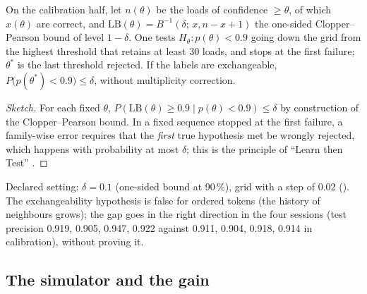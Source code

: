 \begin{proposition}\label{t3mim:prop:conforme}
On the calibration half, let $n(\theta)$ be the loads of confidence $\ge \theta$, of which $x(\theta)$ are correct, and $\mathrm{LB}(\theta) = B^{-1}(\delta;\, x, n - x + 1)$ the one-sided Clopper--Pearson bound \cite{clopper1934} of level $1 - \delta$. One tests $H_\theta : p(\theta) < 0.9$ going down the grid from the highest threshold that retains at least 30 loads, and stops at the first failure; $\theta^\ast$ is the last threshold rejected. If the labels are exchangeable, $P\bigl(p(\theta^\ast) < 0.9\bigr) \le \delta$, without multiplicity correction.
\end{proposition}
\begin{proof}[Sketch]
For each fixed $\theta$, $P(\mathrm{LB}(\theta) \ge 0.9 \mid p(\theta) < 0.9) \le \delta$ by construction of the Clopper--Pearson bound. In a fixed sequence stopped at the first failure, a family-wise error requires that the \emph{first} true hypothesis met be wrongly rejected, which happens with probability at most $\delta$; this is the principle of ``Learn then Test'' \cite{angelopoulos2021ltt}.
\end{proof}
Declared setting: $\delta = 0.1$ (one-sided bound at 90\,\%), grid with a step of 0.02 (). The exchangeability hypothesis is false for ordered tokens (the history of neighbours grows); the gap goes in the right direction in the four sessions (test precision 0.919, 0.905, 0.947, 0.922 against 0.911, 0.904, 0.918, 0.914 in calibration), without proving it.

\subsection{The simulator and the gain}\label{t3mim:sec:p4-gain}

